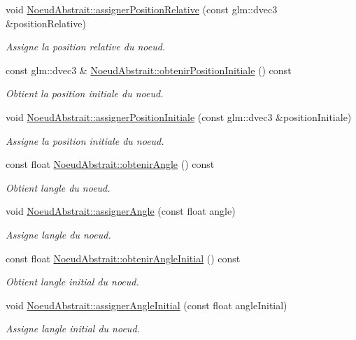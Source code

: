\begin{DoxyCompactItemize}
void \hyperlink{group__inf2990_ga11e12e42b05a5327c92cd7fd1b7e5a24}{Noeud\+Abstrait\+::assigner\+Position\+Relative} (const glm\+::dvec3 \&position\+Relative)
\begin{DoxyCompactList}\small\item\em Assigne la position relative du noeud. \end{DoxyCompactList}\item 
const glm\+::dvec3 \& \hyperlink{group__inf2990_ga5e57e4e6ac1df01d25098fbeb7fcc56d}{Noeud\+Abstrait\+::obtenir\+Position\+Initiale} () const 
\begin{DoxyCompactList}\small\item\em Obtient la position initiale du noeud. \end{DoxyCompactList}\item 
void \hyperlink{group__inf2990_ga18ba04a32eaa8942418950a647e5e717}{Noeud\+Abstrait\+::assigner\+Position\+Initiale} (const glm\+::dvec3 \&position\+Initiale)
\begin{DoxyCompactList}\small\item\em Assigne la position initiale du noeud. \end{DoxyCompactList}\item 
const float \hyperlink{group__inf2990_ga9f5f0864e56b552efe95e693c198a3b4}{Noeud\+Abstrait\+::obtenir\+Angle} () const 
\begin{DoxyCompactList}\small\item\em Obtient l\textquotesingle{}angle du noeud. \end{DoxyCompactList}\item 
void \hyperlink{group__inf2990_ga7977957d758ca590a057aa33d76e5e75}{Noeud\+Abstrait\+::assigner\+Angle} (const float angle)
\begin{DoxyCompactList}\small\item\em Assigne l\textquotesingle{}angle du noeud. \end{DoxyCompactList}\item 
const float \hyperlink{group__inf2990_ga61797fb6a426150891203ea91e3f2cb8}{Noeud\+Abstrait\+::obtenir\+Angle\+Initial} () const 
\begin{DoxyCompactList}\small\item\em Obtient l\textquotesingle{}angle initial du noeud. \end{DoxyCompactList}\item 
void \hyperlink{group__inf2990_gaf0e7fd3676087b70949012a945000509}{Noeud\+Abstrait\+::assigner\+Angle\+Initial} (const float angle\+Initial)
\begin{DoxyCompactList}\small\item\em Assigne l\textquotesingle{}angle initial du noeud. \end{DoxyCompactList}\item 

\end{DoxyCompactItemize}
